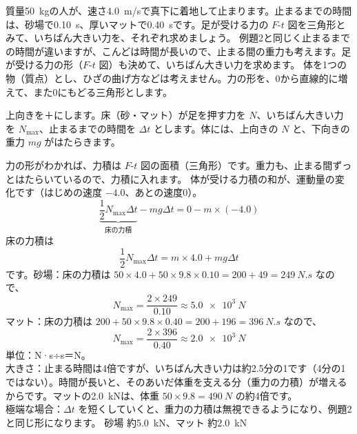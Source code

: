 \label{ph:力-3:ex3}
\begin{phreidai}[砂場とマットに着地する]
質量\qty{50}{kg}の人が、速さ\qty{4.0}{m/s}で真下に着地して止まります。止まるまでの時間は、砂場で\qty{0.10}{s}、厚いマットで\qty{0.40}{s}です。足が受ける力の $F$-$t$ 図を三角形とみて、いちばん大きい力を、それぞれ求めましょう。
\phbamen
例題2と同じく止まるまでの時間が違いますが、こんどは時間が長いので、止まる間の重力も考えます。足が受ける力の形（$F$-$t$ 図）も決めて、いちばん大きい力を求めます。
\phmushi
体を1つの物（質点）とし、ひざの曲げ方などは考えません。力の形を、0から直線的に増えて、また0にもどる三角形とします。
\phzu
\noindent\begin{minipage}[c]{0.5\linewidth}\centering
{}
\end{minipage}\hfill
\begin{minipage}[c]{0.47\linewidth}\raggedright
上向きを＋にします。床（砂・マット）が足を押す力を $N$、いちばん大きい力を $N_{\max}$、止まるまでの時間を $\Delta t$ とします。体には、上向きの $N$ と、下向きの重力 $mg$ がはたらきます。
\end{minipage}
\phriyu
力の形がわかれば、力積は $F$-$t$ 図の面積（三角形）です。重力も、止まる間ずっとはたらいているので、力積に入れます。
\phtateru
体が受ける力積の和が、運動量の変化です（はじめの速度 $-4.0$、あとの速度0）。
\[\underbrace{\frac{1}{2}N_{\max}\Delta t}_{\text{床の力積}}-mg\Delta t=0-m\times(-4.0)\]
\phtoku
床の力積は
\[\frac{1}{2}N_{\max}\Delta t=m\times4.0+mg\Delta t\]
です。砂場：床の力積は $50\times4.0+50\times9.8\times0.10=200+49=\qty{249}{N.s}$ なので、
\[N_{\max}=\frac{2\times249}{0.10}\approx\qty{5.0e3}{N}\]
マット：床の力積は $200+50\times9.8\times0.40=200+196=\qty{396}{N.s}$ なので、
\[N_{\max}=\frac{2\times396}{0.40}\approx\qty{2.0e3}{N}\]
\phtashikame
単位：N·s÷s＝N。\\
大きさ：止まる時間は4倍ですが、いちばん大きい力は約2.5分の1です（4分の1ではない）。時間が長いと、そのあいだ体重を支える分（重力の力積）が増えるからです。マットの\qty{2.0}{kN}は、体重 $50\times9.8=\qty{490}{N}$ の約4倍です。\\
極端な場合：$\Delta t$ を短くしていくと、重力の力積は無視できるようになり、例題2と同じ形になります。
\kotae 砂場 約\qty{5.0}{kN}、マット 約\qty{2.0}{kN}
\end{phreidai}
